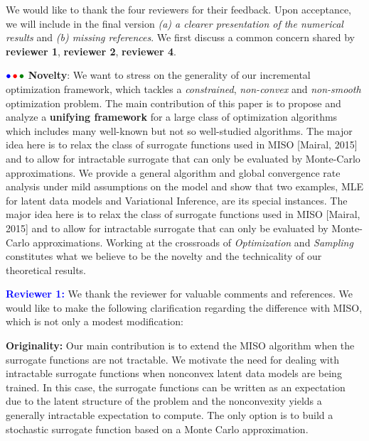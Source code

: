 \documentclass{article}
\begin{document}
We would like to thank the four reviewers for their feedback. Upon acceptance, we will include in the final version \emph{{\sf (a)} a clearer presentation of the numerical results} and \emph{{\sf (b)} missing references}. 
We first discuss a common concern shared by \textbf{\color{blue}reviewer 1}, \textbf{\color{red} reviewer 2},
\textbf{\color{green!50!black}reviewer 4}.\vspace{-3pt}

${\color{blue}\bullet}\!~{\color{red}\bullet}\!~{\color{green!50!black}\bullet}$ \textbf{Novelty}: 
We want to stress on the generality of our incremental optimization framework, which tackles a \emph{constrained}, \emph{non-convex} and \emph{non-smooth} optimization problem. 
The main contribution of this paper is to propose and analyze a \textbf{unifying framework} for a large class of optimization algorithms which includes many well-known but not so well-studied algorithms.
The major idea here is to relax the class of surrogate functions used in MISO [Mairal, 2015] and to allow for intractable surrogate that can only be evaluated by Monte-Carlo approximations.
We provide a general algorithm and global convergence rate analysis under mild assumptions on the model and show that two examples, MLE for latent data models and Variational Inference, are its special instances.
The major idea here is to relax the class of surrogate functions used in MISO [Mairal, 2015] and to allow for intractable surrogate that can only be evaluated by Monte-Carlo approximations.
Working at the crossroads of \emph{Optimization} and \emph{Sampling} constitutes what we believe to be the novelty and the technicality of our theoretical results.


\textbf{\textcolor{blue}{Reviewer 1:}} We thank the reviewer for valuable comments and references. We would like to make the following clarification regarding the difference with MISO, which is not only a modest modification:\vspace{-5pt}

\textbf{Originality:} Our main contribution is to extend the MISO algorithm when the surrogate functions are not tractable. 
We motivate the need for dealing with intractable surrogate functions when nonconvex latent data models are being trained. 
In this case, the surrogate functions can be written as an expectation due to the latent structure of the problem and the nonconvexity yields a generally intractable expectation to compute. 
The only option is to build a stochastic surrogate function based on a Monte Carlo approximation.
\end{document}
